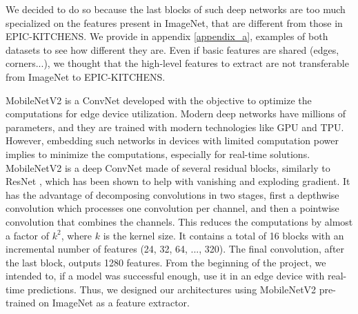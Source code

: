 \documentclass[12pt, a4paper]{report}
\begin{document}
				We decided to do so because the last blocks of such deep networks are too much specialized on the features present in ImageNet, that are different from those in EPIC-KITCHENS.
				We provide in appendix \ref{appendix_a}, examples of both datasets to see how different they are.
				Even if basic features are shared (edges, corners...), we thought that the high-level features to extract are not transferable from ImageNet to EPIC-KITCHENS.
				\par
				{\boldtahomafont MobileNetV2} \cite{sandler2019mobilenetv2} is a ConvNet developed with the objective to optimize the computations for edge device utilization.
				Modern deep networks have millions of parameters, and they are trained with modern technologies like GPU and TPU.
				However, embedding such networks in devices with limited computation power implies to minimize the computations, especially for real-time solutions.
				MobileNetV2 is a deep ConvNet made of several residual blocks, similarly to ResNet \cite{he2015deep}, which has been shown to help with vanishing and exploding gradient.
				It has the advantage of decomposing convolutions in two stages, first a depthwise convolution which processes one convolution per channel, and then a pointwise convolution that combines the channels.
				This reduces the computations by almost a factor of $k^{2}$, where $k$ is the kernel size.
				It contains a total of 16 blocks with an incremental number of features (24, 32, 64, ..., 320).
				The final convolution, after the last block, outputs 1280 features.
				From the beginning of the project, we intended to, if a model was successful enough, use it in an edge device with real-time predictions.
				Thus, we designed our architectures using MobileNetV2 pre-trained on ImageNet as a feature extractor.
\end{document}
